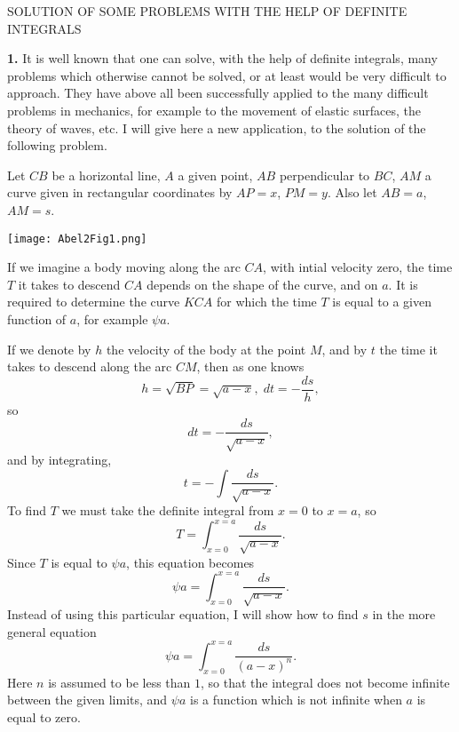 \documentclass[12pt]{article}
\begin{document}
\begin{center}
SOLUTION OF SOME PROBLEMS WITH THE HELP OF DEFINITE INTEGRALS
\end{center}

\textbf{1.} It is well known that one can solve, with the help of definite integrals, many problems which otherwise cannot be solved, or at least would be very difficult to approach.  They have above all been successfully applied to the many difficult problems in mechanics, for example to the movement of elastic surfaces, the theory of waves, etc.  I will give here a new application, to the solution of the following problem.

Let $CB$ be a horizontal line, $A$ a given point, $AB$ perpendicular to $BC$, $AM$ a curve given in rectangular coordinates by $AP = x$, $PM = y$.  Also let $AB = a$, $AM = s$. 
 \begin{center} \texttt{[image: Abel2Fig1.png]}  \end{center}
If we imagine a body moving along the arc $CA$, with intial velocity zero, the time $T$ it takes to descend $CA$ depends on the shape of the curve, and on $a$.  It is required to determine the curve $KCA$ for which the time $T$ is equal to a given function of $a$, for example $\psi a$.

If we denote by $h$ the velocity of the body at the point $M$, and by $t$ the time it takes to descend along the arc $CM$, then as one knows
\[ h = \sqrt{BP} = \sqrt{a-x}, \; dt = - \frac{ds}{h}, \]
so 
\[ dt = - \frac{ds}{\sqrt{a-x}} , \]
and by integrating,
\[ t = - \int \frac{ds}{\sqrt{a-x}} . \]
To find $T$ we must take the definite integral from $x=0$ to $x=a$, so
\[ T = \int_{x=0}^{x=a} \frac{ds}{\sqrt{a-x}} . \]
Since $T$ is equal to $\psi a$, this equation becomes 
\[ \psi a = \int_{x=0}^{x=a} \frac{ds}{\sqrt{a-x}} .\]
Instead of using this particular equation, I will show how to find $s$ in the more general equation
\[ \psi a = \int_{x=0}^{x=a} \frac{ds}{(a-x)^n}. \]
Here $n$ is assumed to be less than $1$, so that the integral does not become infinite between the given limits, and $\psi a$ is a function which is not infinite when $a$ is equal to zero.   
\end{document}
